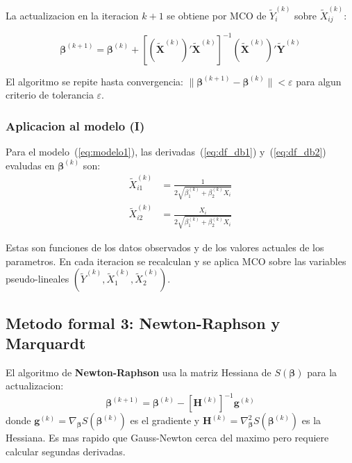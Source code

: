 \documentclass[12pt, letterpaper]{article}
\theoremstyle{remark}
\begin{document}
La actualizacion en la iteracion $k+1$ se obtiene por MCO de
$\tilde Y_i^{(k)}$ sobre $\tilde X_{ij}^{(k)}$:

\begin{equation}
  \boldsymbol\beta^{(k+1)}
    = \boldsymbol\beta^{(k)}
    + \left[(\tilde{\mathbf{X}}^{(k)})'\tilde{\mathbf{X}}^{(k)}\right]^{-1}
      (\tilde{\mathbf{X}}^{(k)})' \tilde{\mathbf{Y}}^{(k)}
  \label{eq:GN_update}
\end{equation}

El algoritmo se repite hasta convergencia: $\|\boldsymbol\beta^{(k+1)} - \boldsymbol\beta^{(k)}\| < \varepsilon$
para algun criterio de tolerancia $\varepsilon$.

\subsubsection{Aplicacion al modelo (I)}

Para el modelo~(\ref{eq:modelo1}), las derivadas~(\ref{eq:df_db1}) y~(\ref{eq:df_db2})
evaludas en $\boldsymbol\beta^{(k)}$ son:
\begin{align}
  \tilde X_{i1}^{(k)} &= \frac{1}{2\sqrt{\beta_1^{(k)} + \beta_2^{(k)} X_i}}
  \label{eq:GN_X1}\\
  \tilde X_{i2}^{(k)} &= \frac{X_i}{2\sqrt{\beta_1^{(k)} + \beta_2^{(k)} X_i}}
  \label{eq:GN_X2}
\end{align}

Estas son funciones de los datos observados y de los valores actuales de los
parametros. En cada iteracion se recalculan y se aplica MCO sobre las
variables pseudo-lineales $(\tilde Y^{(k)}, \tilde X_1^{(k)}, \tilde X_2^{(k)})$.

\subsection{Metodo formal 3: Newton-Raphson y Marquardt}

El algoritmo de \textbf{Newton-Raphson} usa la matriz Hessiana de $S(\boldsymbol\beta)$
para la actualizacion:
\begin{equation}
  \boldsymbol\beta^{(k+1)}
    = \boldsymbol\beta^{(k)}
    - \left[\mathbf{H}^{(k)}\right]^{-1} \mathbf{g}^{(k)}
  \label{eq:NR}
\end{equation}
donde $\mathbf{g}^{(k)} = \nabla_{\boldsymbol\beta} S(\boldsymbol\beta^{(k)})$
es el gradiente y $\mathbf{H}^{(k)} = \nabla^2_{\boldsymbol\beta} S(\boldsymbol\beta^{(k)})$
es la Hessiana. Es mas rapido que Gauss-Newton cerca del maximo pero requiere
calcular segundas derivadas.
\end{document}
